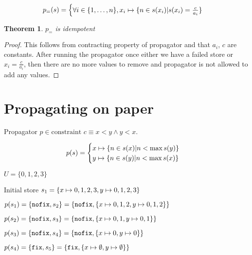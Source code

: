 \documentclass[a4paper, 11pt]{article}
\newtheorem{theorem}{Theorem}[section]
\newcommand\mymapsto{\mathrel{\ooalign{$\rightarrow$\cr%
  \kern-.15ex\raise.275ex\hbox{\scalebox{1}[0.522]{$\mid$}}\cr}}}
\begin{document}
\begin{gather*}
p_=(s) = 
\begin{cases}
  \forall i \in \{1, \ldots, n\}, x_i \mymapsto \{n \in s(x_i) | s(x_i) = \frac{c}{a_i}\}\\
\end{cases}
\end{gather*}

\begin{theorem}
  $p_=$ is idempotent
\end{theorem}
\begin{proof}
This follows from contracting property of propagator and that $a_i$, $c$ are constants. After running the propagator once either we have a failed store or $x_i = \frac{c}{a_i}$, then there are no more values to remove and propagator is not allowed to add any values.
\end{proof}

\section*{Propagating on paper}
Propagator $p \in \text{constraint } c \equiv x < y \land y < x$.

\begin{gather*}
p(s) = 
\begin{cases}
  x \mymapsto \{n \in s(x) | n < \max s(y) \}\\
  y \mymapsto \{n \in s(y) | n < \max s(x) \}\\
\end{cases}
\end{gather*}

$U = \{0,1,2,3\}$

Initial store $s_1 = \{x \mymapsto {0,1,2,3}, y \mymapsto {0,1,2,3}\}$

$p(s_1) = \{\text{\texttt{nofix}}, s_2\} = \{\text{\texttt{nofix}}, \{x \mymapsto {0,1,2}, y \mymapsto {0,1,2}\}\}$

$p(s_2) = \{\text{\texttt{nofix}}, s_3\} = \{\text{\texttt{nofix}}, \{x \mymapsto {0,1}, y \mymapsto {0,1}\}\}$

$p(s_3) = \{\text{\texttt{nofix}}, s_4\} = \{\text{\texttt{nofix}}, \{x \mymapsto {0}, y \mymapsto {0}\}\}$

$p(s_4) = \{\text{\texttt{fix}}, s_5\} = \{\text{\texttt{fix}}, \{x \mymapsto \emptyset, y \mymapsto \emptyset\}\}$ 


{}

\end{document}
